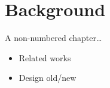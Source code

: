 \chapter*{Background}
A non-numbered chapter\dots

\begin{itemize}
  \item Related works
  \item Design old/new
\end{itemize}